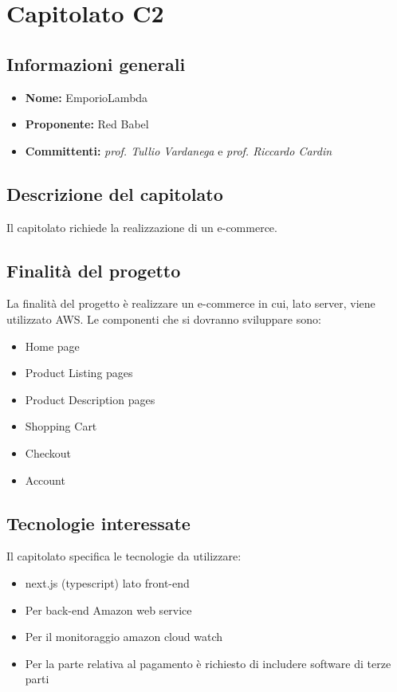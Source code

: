 \section{Capitolato C2}

\subsection{Informazioni generali}
\begin{itemize}
\item \textbf{Nome:} EmporioLambda
\item \textbf{Proponente:} Red Babel
\item \textbf{Committenti:} \textit{prof. Tullio Vardanega} e \textit{prof. Riccardo Cardin}
\end{itemize}

\subsection{Descrizione del capitolato}
Il capitolato richiede la realizzazione di un e-commerce.

\subsection{Finalità del progetto}
La finalità del progetto è realizzare un e-commerce in cui, lato server, viene utilizzato AWS. Le componenti che si dovranno sviluppare sono:
\begin{itemize}
\item Home page
\item Product Listing pages
\item Product Description pages
\item Shopping Cart
\item Checkout
\item Account
\end{itemize}

\subsection{Tecnologie interessate}
Il capitolato specifica le tecnologie da utilizzare:
\begin{itemize}
\item next.js (typescript) lato front-end
\item Per back-end Amazon web service
\item Per il monitoraggio amazon cloud watch
\item Per la parte relativa al pagamento è richiesto di includere software di terze parti
\end{itemize}

